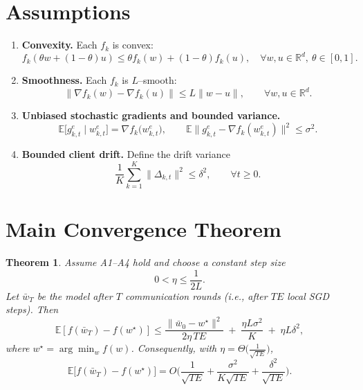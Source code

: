 \documentclass{article}
\newtheorem{theorem}{Theorem}
\newcommand{\E}{\mathbb{E}}
\newcommand{\R}{\mathbb{R}}
\begin{document}
\section*{Assumptions}
\begin{enumerate}[label={A\arabic*:},leftmargin=*]
\item \textbf{Convexity.} Each $f_k$ is convex:
\[
f_k(\theta w+(1-\theta)u)\le \theta f_k(w)+(1-\theta)f_k(u),\quad\forall w,u\in\R^d,\ \theta\in[0,1].
\]

\item \textbf{Smoothness.} Each $f_k$ is $L$–smooth:
\begin{equation}\label{eq:smooth}
\|\nabla f_k(w)-\nabla f_k(u)\|\le L\|w-u\|,\qquad\forall w,u\in\R^d.
\end{equation}

\item \textbf{Unbiased stochastic gradients and bounded variance.}
\[
\E\big[g_{k,t}^e\mid w_{k,t}^e\big]=\nabla f_k\big(w_{k,t}^e\big),\qquad
\E\big\|g_{k,t}^e-\nabla f_k(w_{k,t}^e)\big\|^2\le\sigma^2.
\]

\item \textbf{Bounded client drift.}
Define the drift variance
\begin{equation}\label{eq:drift}
\frac1K\sum_{k=1}^{K}\|\Delta_{k,t}\|^2\le \delta^2,\qquad\forall t\ge0.
\end{equation}
\end{enumerate}

\section*{Main Convergence Theorem}
\begin{theorem}\label{thm:main}
Assume A1–A4 hold and choose a constant step size
\[
0<\eta\le\frac{1}{2L}.
\]
Let $\bar w_T$ be the model after $T$ communication rounds (i.e., after $TE$ local SGD steps). Then
\begin{equation}\label{eq:bound}
\E\!\left[f(\bar w_T)-f(w^\star)\right]
\le
\frac{\| \bar w_0-w^\star\|^2}{2\eta\,TE}
\;+\;
\frac{\eta L\sigma^2}{K}
\;+\;
\eta L\delta^2,
\end{equation}
where $w^\star=\arg\min_{w}f(w)$.
Consequently, with $\eta=\Theta\!\big(\frac{1}{\sqrt{TE}}\big)$,
\[
\E\!\big[f(\bar w_T)-f(w^\star)\big]=O\!\Big(\frac{1}{\sqrt{TE}}+\frac{\sigma^2}{K\sqrt{TE}}+\frac{\delta^2}{\sqrt{TE}}\Big).
\]
\end{theorem}
\end{document}
